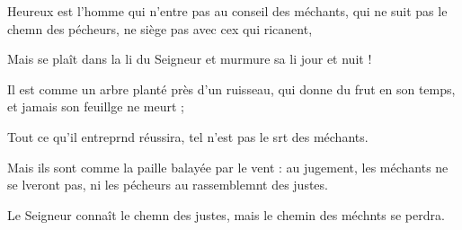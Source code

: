\item Heureux est l’homme qui n’entre pas au conseil des méchants,\pscross{} qui ne suit pas le chemn des pécheurs,\psstar{} ne siège pas avec cex qui ricanent,
\item Mais se plaît dans la li du Seigneur\psstar{} et murmure sa li jour et nuit !
\item Il est comme un arbre planté près d’un ruisseau,\pscross{} qui donne du frut en son temps,\psstar{} et jamais son feuillge ne meurt ;
\item Tout ce qu’il entreprnd réussira,\psstar{} tel n’est pas le srt des méchants.
\item Mais ils sont comme la paille balayée par le vent :\pscross{} au jugement, les méchants ne se lveront pas,\psstar{} ni les pécheurs au rassemblemnt des justes.
\item Le Seigneur connaît le chemn des justes,\psstar{} mais le chemin des méchnts se perdra.